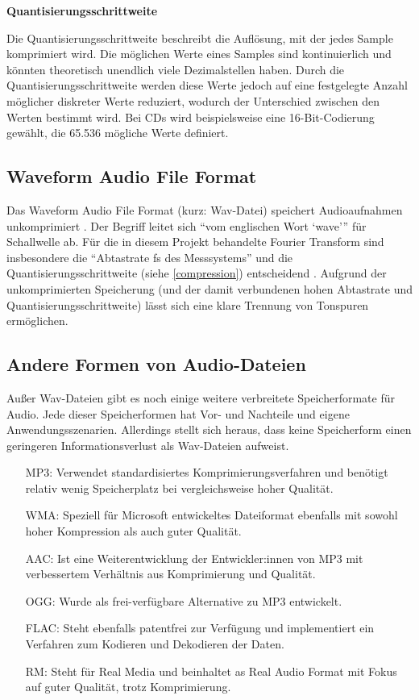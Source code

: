 %
\textbf{Quantisierungsschrittweite}
%

Die Quantisierungsschrittweite beschreibt die Auflösung, mit der jedes Sample komprimiert wird. Die möglichen Werte eines Samples sind kontinuierlich und könnten theoretisch unendlich viele Dezimalstellen haben. Durch die Quantisierungsschrittweite werden diese Werte jedoch auf eine festgelegte Anzahl möglicher diskreter Werte reduziert, wodurch der Unterschied zwischen den Werten bestimmt wird. Bei CDs wird beispielsweise eine 16-Bit-Codierung gewählt, die 65.536 mögliche Werte definiert.

%
\subsection{Waveform Audio File Format}
%

Das Waveform Audio File Format (kurz: Wav-Datei) speichert Audioaufnahmen unkomprimiert \parencite{what_is_a_wav_file}. Der Begriff leitet sich \enquote{vom englischen Wort \enquote{wave}} \parencite{wav} für Schallwelle ab. Für die in diesem Projekt behandelte Fourier Transform sind insbesondere die \enquote{Abtastrate fs des Messsystems} und die Quantisierungsschrittweite (siehe \cref{compression}) entscheidend  \parencite{FFT_grundlagen}. Aufgrund der unkomprimierten Speicherung (und der damit verbundenen hohen Abtastrate und Quantisierungsschrittweite) lässt sich eine klare Trennung von Tonspuren ermöglichen.


%
\subsection{Andere Formen von Audio-Dateien}
\label{audio_representations}
%

Außer Wav-Dateien gibt es noch einige weitere verbreitete Speicherformate für Audio. Jede dieser Speicherformen hat Vor- und Nachteile und eigene Anwendungsszenarien. Allerdings stellt sich heraus, dass keine Speicherform einen geringeren Informationsverlust als Wav-Dateien aufweist.

%
\begin{itemize}
    \item [MP3:] Verwendet standardisiertes Komprimierungsverfahren und benötigt relativ wenig Speicherplatz bei vergleichsweise hoher Qualität.
    \item [WMA:] Speziell für Microsoft entwickeltes Dateiformat ebenfalls mit sowohl hoher Kompression als auch guter Qualität.
    \item [AAC:] Ist eine Weiterentwicklung der Entwickler:innen von MP3 mit verbessertem Verhältnis aus Komprimierung und Qualität.
    \item [OGG:] Wurde als frei-verfügbare Alternative zu MP3 entwickelt.
    \item [FLAC:] Steht ebenfalls patentfrei zur Verfügung und implementiert ein Verfahren zum Kodieren und Dekodieren der Daten.
    \item [RM:] Steht für Real Media und beinhaltet as Real Audio Format mit Fokus auf guter Qualität, trotz Komprimierung.
\end{itemize}
%

